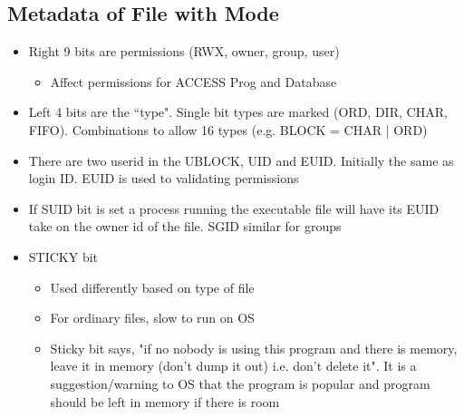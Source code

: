 \subsection{Metadata of File with Mode}
\begin{itemize}
    \item Right 9 bits are permissions  (RWX, owner, group, user)
    \begin{itemize}
        \item Affect permissions for ACCESS Prog and Database
    \end{itemize}
    \item Left 4 bits are the ``type". Single bit types are marked (ORD, DIR, CHAR, FIFO). Combinations to allow 16 types (e.g. BLOCK = CHAR | ORD)
    \item There are two userid in the UBLOCK, UID and EUID. Initially the same as login ID. EUID is used to validating permissions
    \item If SUID bit is set a process running the executable file will have its EUID take on the owner id of the file. SGID similar for groups
    \item STICKY bit
    \begin{itemize}
        \item Used differently based on type of file
        \item For ordinary files, slow to run on OS
        \item Sticky bit says, "if no nobody is using this program and there is memory, leave it in memory (don't dump it out) i.e. don't delete it". It is a suggestion/warning to OS that the program is popular and program should be left in memory if there is room
    \end{itemize}
\end{itemize}
